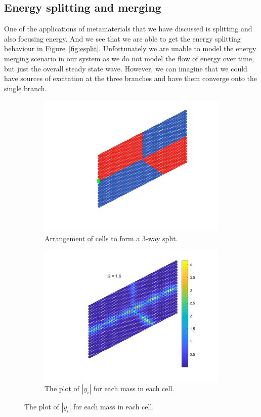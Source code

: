 \subsection{Energy splitting and merging}
One of the applications of metamaterials that we have discussed is splitting
and also focusing energy.\cite{toposplit,diremi,antennasol} And we see that we
are able to get the energy splitting behaviour in Figure~\ref{fig:esplit}.
Unfortunately we are unable to model the energy merging scenario in our system
as we do not model the flow of energy over time, but just the overall steady
state wave. However, we can imagine that we could have sources of excitation at
the three branches and have them converge onto the single branch.

\begin{figure}
\centering
\begin{subfigure}[b]{.5\textwidth}
  \centering
  \includegraphics[width=0.8\linewidth]{imgs/esplitarr.png}
  \caption{Arrangement of cells to form a 3-way split.}
  \label{fig:sub1}
\end{subfigure}%
\begin{subfigure}[b]{.5\textwidth}
  \centering
  \includegraphics[width=1\linewidth]{imgs/esplitscat.png}
  \caption{The plot of $|y_i|$ for each mass in each cell.}
  \label{fig:sub2}
\end{subfigure}


\end{figure}
